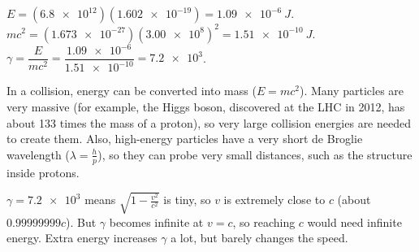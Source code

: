 \documentclass[12pt]{article}
\begin{document}
\ansq
{}
\begin{crit}
\end{crit}
\sample
$E = (\num{6.8e12})(\num{1.602e-19}) = \qty{1.09e-6}{J}$. \quad
$mc^2 = (\num{1.673e-27})(\num{3.00e8})^2 = \qty{1.51e-10}{J}$. \quad
$\gamma = \dfrac{E}{mc^2} = \dfrac{\num{1.09e-6}}{\num{1.51e-10}} = \num{7.2e3}$.
\begin{crit}
\end{crit}
\sample
In a collision, energy can be converted into mass ($E = mc^2$). Many particles are very massive (for
example, the Higgs boson, discovered at the LHC in 2012, has about 133 times the mass of a proton), so very
large collision energies are needed to create them. Also, high-energy particles have a very short de Broglie wavelength
($\lambda = \frac{h}{p}$), so they can probe very small distances, such as the structure inside protons.
\begin{crit}
\end{crit}
\sample
$\gamma = \num{7.2e3}$ means $\sqrt{1 - \frac{v^2}{c^2}}$ is tiny, so $v$ is extremely close to $c$
(about $0.99999999c$). But $\gamma$ becomes infinite at $v = c$, so reaching $c$ would need infinite
energy. Extra energy increases $\gamma$ a lot, but barely changes the speed.
\end{document}
